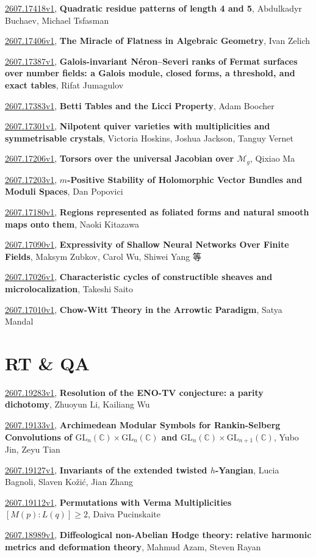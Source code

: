 \documentclass[9pt, a4paper]{article}
\theoremstyle{plain}
\theoremstyle{definition}
\theoremstyle{remark}
\newcommand{\arxiv}[3]{\href{https://arxiv.org/abs/#1}{#1}, \textbf{\textcolor{arxivblue}{#2}}, #3}
\begin{document}
\arxiv{2607.17418v1}{Quadratic residue patterns of length 4 and 5}{Abdulkadyr Buchaev, Michael Tsfasman}

\arxiv{2607.17406v1}{The Miracle of Flatness in Algebraic Geometry}{Ivan Zelich}

\arxiv{2607.17387v1}{Galois-invariant Néron--Severi ranks of Fermat surfaces over number fields: a Galois module, closed forms, a threshold, and exact tables}{Rifat Jumagulov}

\arxiv{2607.17383v1}{Betti Tables and the Licci Property}{Adam Boocher}

\arxiv{2607.17301v1}{Nilpotent quiver varieties with multiplicities and symmetrisable crystals}{Victoria Hoskins, Joshua Jackson, Tanguy Vernet}

\arxiv{2607.17206v1}{Torsors over the universal Jacobian over $\mathcal{M}_g$}{Qixiao Ma}

\arxiv{2607.17203v1}{$m$-Positive Stability of Holomorphic Vector Bundles and Moduli Spaces}{Dan Popovici}

\arxiv{2607.17180v1}{Regions represented as foliated forms and natural smooth maps onto them}{Naoki Kitazawa}

\arxiv{2607.17090v1}{Expressivity of Shallow Neural Networks Over Finite Fields}{Maksym Zubkov, Carol Wu, Shiwei Yang 等}

\arxiv{2607.17026v1}{Characteristic cycles of constructible sheaves and microlocalization}{Takeshi Saito}

\arxiv{2607.17010v1}{Chow-Witt Theory in the Arrowtic Paradigm}{Satya Mandal}


\section{RT \& QA}
\arxiv{2607.19283v1}{Resolution of the ENO-TV conjecture: a parity dichotomy}{Zhuoyun Li, Kailiang Wu}

\arxiv{2607.19133v1}{Archimedean Modular Symbols for Rankin-Selberg Convolutions of $\mathrm{GL}_n(\mathbb{C})\times\mathrm{GL}_n(\mathbb{C})$ and $\mathrm{GL}_n(\mathbb{C})\times\mathrm{GL}_{n+1}(\mathbb{C})$}{Yubo Jin, Zeyu Tian}

\arxiv{2607.19127v1}{Invariants of the extended twisted $h$-Yangian}{Lucia Bagnoli, Slaven Kožić, Jian Zhang}

\arxiv{2607.19112v1}{Permutations with Verma Multiplicities $[M(p):L(q)] \geq 2$}{Daiva Pucinskaite}

\arxiv{2607.18989v1}{Diffeological non-Abelian Hodge theory: relative harmonic metrics and deformation theory}{Mahmud Azam, Steven Rayan}
\end{document}

